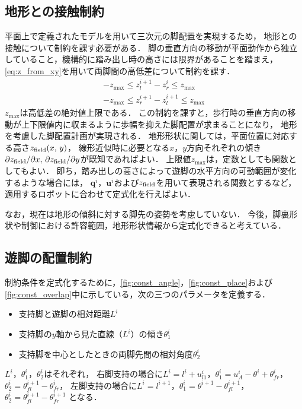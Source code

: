 \documentclass[autodetect-engine,dvipdfmx-if-dvi,ja=standard,a4j,jbase=11pt,magstyle=nomag*]{bxjsreport}
\begin{document}
\subsection{地形との接触制約}
\label{subseq:field_contact_constraint}
平面上で定義されたモデルを用いて三次元の脚配置を実現するため，
地形との接触について制約を課す必要がある．
脚の垂直方向の移動が平面動作から独立していること，機構的に踏み出し時の高さには限界があることを踏まえ，
\cref{eq:z_from_xy}を用いて両脚間の高低差について制約を課す．
\begin{equation} \label{eq:z_field_const}
    \begin{gathered}
        -z_{\mathrm{max}} \leq z_l^{i + 1} - z_r^i \leq z_{\mathrm{max}} \\
        -z_{\mathrm{max}} \leq z_r^{i + 1} - z_l^{i + 1} \leq z_{\mathrm{max}}
    \end{gathered}
\end{equation}
$z_{\mathrm{max}}$は高低差の絶対値上限である．
この制約を課すと，歩行時の垂直方向の移動が上下限値内に収まるように歩幅を抑えた脚配置が求まることになり，
地形を考慮した脚配置計画が実現される．
地形形状に関しては，平面位置に対応する高さ$z_{\mathrm{field}} ( x ,\, y )$，
線形近似時に必要となる$x$，$y$方向それぞれの傾き$\partial z_{\mathrm{field}} / \partial x ,\, \partial z_{\mathrm{field}} / \partial y$が既知であればよい．
上限値$z_{\mathrm{max}}$は，定数としても関数としてもよい．
即ち，踏み出しの高さによって遊脚の水平方向の可動範囲が変化するような場合には，
$\bm{q}^i$，$\bm{u}^i$および$z_{\mathrm{field}}$を用いて表現される関数とするなど，
適用するロボットに合わせて定式化を行えばよい．

なお，現在は地形の傾斜に対する脚先の姿勢を考慮していない．
今後，脚裏形状や制御における許容範囲，地形形状情報から定式化できると考えている．



\subsection{遊脚の配置制約}
制約条件を定式化するために，\cref{fig:const_angle}，\cref{fig:const_place}および\cref{fig:const_overlap}中に示している，次の三つのパラメータを定義する．
\begin{itemize}
    \item 支持脚と遊脚の相対距離$L^i$
    \item 支持脚の$y$軸から見た直線（$L^i$）の傾き$\theta_1^i$
    \item 支持脚を中心としたときの両脚先間の相対角度$\theta_2^i$
\end{itemize}
$L^i$，$\theta_1^i$，$\theta_2^i$はそれぞれ，
右脚支持の場合に$L^i = l^i + u_{l1}^i$，$\theta_1^i = u_A^i - \theta^i + \theta_{fr}^i$，$\theta_2^i = \theta_{fl}^{i + 1} - \theta_{fr}^i$，
左脚支持の場合に$L^i = l^{i + 1}$，$\theta_1^i = \theta^{i + 1} - \theta_{fl}^{i + 1}$，$\theta_2^i = \theta_{fl}^{i + 1} - \theta_{fr}^{i + 1}$
となる．
\end{document}
